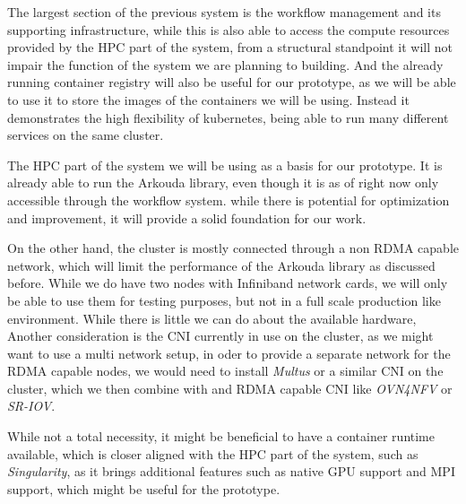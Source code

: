 The largest section of the previous system is the workflow management and its supporting infrastructure,
while this is also able to access the compute resources provided by the \ac{HPC} part of the system,
from a structural standpoint it will not impair the function of the system we are planning to building.
And the already running container \gls{registry} will also be useful for our prototype, as we will be able to use it to store the images of the containers we will be using.
Instead it demonstrates the high flexibility of kubernetes, being able to run many different services on the same cluster.


The \ac{HPC} part of the system we will be using as a basis for our prototype.
It is already able to run the Arkouda library, even though it is as of right now only accessible  through the workflow system.
while there is potential for optimization and improvement, it will provide a solid foundation for our work.

On the other hand, the cluster is mostly connected through a non \ac{RDMA} capable network,
which will limit the performance of the Arkouda library as discussed before.
While we do have two nodes with Infiniband network cards, we will only be able to use them for testing purposes,
but not in a full scale production like environment.
While there is little we can do about the available hardware,
Another consideration is the \ac{CNI} currently in use on the cluster,
as we might want to use a multi network setup, in oder to provide a separate network for the \ac{RDMA} capable nodes,
we would need to install \textit{Multus} or a similar \ac{CNI} on the cluster, which we then combine
with and \ac{RDMA} capable \ac{CNI} like \textit{OVN4NFV} or \textit{SR-IOV}.

While not a total necessity, it might be beneficial to have a container runtime available,
which is closer aligned with the \ac{HPC} part of the system, such as \textit{Singularity},
as it brings additional features such as native \ac{GPU} support and \ac{MPI} support, which might be useful for the prototype.

\pagebreak